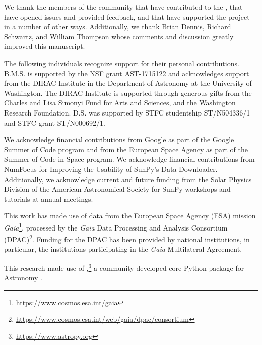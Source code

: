 \acknowledgments

We thank the members of the community that have contributed to the \sunpyproj, that have opened issues and provided feedback, and that have supported the project in a number of other ways.
Additionally, we thank Brian Dennis, Richard Schwartz, and William Thompson whose comments and discussion greatly improved this manuscript.

The following individuals recognize support for their personal contributions.
B.M.S. is supported by the NSF grant AST-1715122 and acknowledges support from the DIRAC Institute in the Department of Astronomy at the University of Washington.
The DIRAC Institute is supported through generous gifts from the Charles and Lisa Simonyi Fund for Arts and Sciences, and the Washington Research Foundation.
D.S. was supported by STFC studentship ST/N504336/1 and STFC grant ST/N000692/1.

We acknowledge financial contributions from Google as part of the Google Summer of Code program and from the European Space Agency as part of the Summer of Code in Space program.
We acknowledge financial contributions from NumFocus for Improving the Usability of SunPy’s Data Downloader.
Additionally, we acknowledge current and future funding from the Solar Physics Division of the American Astronomical Society for SunPy workshops and tutorials at annual meetings.

This work has made use of data from the European Space Agency (ESA) mission \textit{Gaia}\footnote{\url{https://www.cosmos.esa.int/gaia}}, processed by the \textit{Gaia} Data Processing and Analysis Consortium (DPAC)\footnote{\url{https://www.cosmos.esa.int/web/gaia/dpac/consortium}}.
Funding for the DPAC has been provided by national institutions, in particular, the institutions participating in the {\it Gaia} Multilateral Agreement.

This research made use of \astropypkg,\footnote{\url{https://www.astropy.org}} a community-developed core Python package for Astronomy \citep{astropy2013, astropy2018}.

